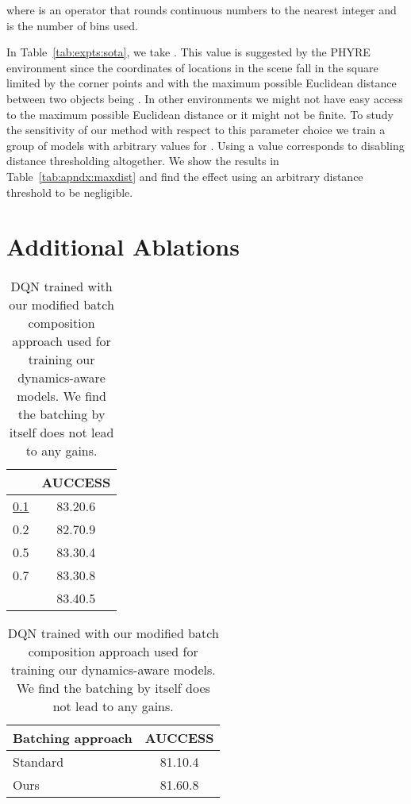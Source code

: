 \documentclass{article}
\newcommand{\demph}[1]{\textcolor{demphcolor}{#1}}
\newcommand{\pms}[2]{#1{\tiny{{\demph{{#2}}}}}}
\begin{document}
where  is an operator that rounds continuous numbers to the nearest integer and  is the number of bins used.


In Table~\ref{tab:expts:sota}, we take . This value is suggested by the PHYRE environment since the coordinates of locations in the scene fall in the square limited by the corner points  and  with the maximum possible Euclidean distance between two objects being . In other environments we might not have easy access to the maximum possible Euclidean distance or it might not be finite. To study the sensitivity of our method with respect to this parameter choice we train a group of models with arbitrary values for . Using a value  corresponds to disabling distance thresholding altogether. We show the results in Table~\ref{tab:apndx:maxdist} and find the effect using an arbitrary distance threshold to be negligible.


\section{Additional Ablations}


\begin{table}[t]
    \begin{minipage}[t]{0.53\linewidth}
    \caption{
            Maximum distance at which distances are clipped. We find stable performance across different clipping distance, and use 0.1 for final results.
            \label{tab:apndx:maxdist}}
            \centering
            \vspace{1mm}
            \begin{tabular}{lc}
            \toprule
             & \bf AUCCESS  \\
            \midrule
            \underline{0.1} & \pms{83.2}{0.6} \\
            0.2 & \pms{82.7}{0.9} \\
            0.5  & \pms{83.3}{0.4} \\
            0.7  & \pms{83.3}{0.8}  \\
             & \pms{83.4}{0.5}  \\
            \bottomrule
            \end{tabular}
    \end{minipage}
    \hfill
    \begin{minipage}[t]{0.44\linewidth}
    \caption{
DQN trained with our modified batch composition approach used for training our dynamics-aware models. We find the batching by itself does not lead to any gains.
    \label{tab:apndx:ablations:sampling}}
       \vspace{1mm}
       \centering
        \begin{tabular}{lc}
                \toprule
                \bf Batching approach   &\bf AUCCESS \\
                \midrule
                Standard~\cite{bakhtin2019phyre} & \pms{81.1}{0.4} \\
                Ours & \pms{81.6}{0.8}\\
                \bottomrule
        \end{tabular}
    \end{minipage}
\end{table}
\end{document}

